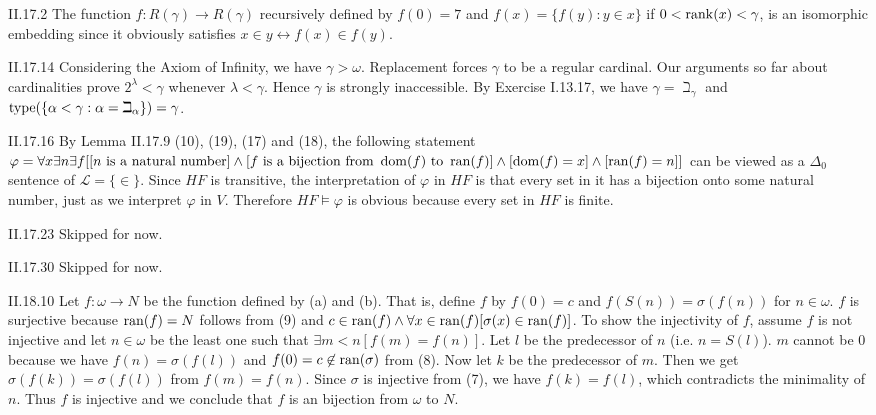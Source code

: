 \documentclass[12pt]{article}
\begin{document}
\begin{customthm}{II.17.2}
  The function $f:R(\gamma)\rightarrow R(\gamma)$ recursively defined by $f(0)=7$ and $f(x)=\{f(y):y\in x\}$ if $0<\mathop{\mathrm{rank}}(x)<\gamma$, is an isomorphic embedding since it obviously satisfies $x\in y\leftrightarrow f(x)\in f(y)$.
\end{customthm}

\begin{customthm}{II.17.14}
  Considering the Axiom of Infinity, we have $\gamma>\omega$. Replacement forces $\gamma$ to be a regular cardinal. Our arguments so far about cardinalities prove $2^\lambda<\gamma$ whenever $\lambda<\gamma$. Hence $\gamma$ is strongly inaccessible. By Exercise I.13.17, we have $\gamma=\beth_\gamma$ and $\mathop{\mathrm{type}}(\{\alpha<\gamma:\alpha=\beth_\alpha\})=\gamma$.
\end{customthm}

\begin{customthm}{II.17.16}
  By Lemma II.17.9 (10), (19), (17) and (18), the following statement $\varphi=\forall x\exists n\exists f[[n\textrm{ is a natural number}]\wedge[f\textrm{ is a bijection from }\mathop{\mathrm{dom}}(f)\textrm{ to }\mathop{\mathrm{ran}}(f)]\wedge[\mathop{\mathrm{dom}}(f)=x]\wedge[\mathop{\mathrm{ran}}(f)=n]]$ can be viewed as a $\Delta_0$ sentence of $\mathcal{L}=\{\in\}$. Since $HF$ is transitive, the interpretation of $\varphi$ in $HF$ is that every set in it has a bijection onto some natural number, just as we interpret $\varphi$ in $V$. Therefore $HF\models\varphi$ is obvious because every set in $HF$ is finite.
\end{customthm}

\begin{customthm}{II.17.23}
  Skipped for now.
\end{customthm}

\begin{customthm}{II.17.30}
  Skipped for now.
\end{customthm}

\begin{customthm}{II.18.10}
  Let $f:\omega\rightarrow N$ be the function defined by (a) and (b). That is, define $f$ by $f(0)=c$ and $f(S(n))=\sigma(f(n))$ for $n\in\omega$. $f$ is surjective because $\mathop{\mathrm{ran}}(f)=N$ follows from (9) and $c\in\mathop{\mathrm{ran}}(f)\wedge\forall x\in\mathop{\mathrm{ran}}(f)[\sigma(x)\in\mathop{\mathrm{ran}}(f)]$. To show the injectivity of $f$, assume $f$ is not injective and let $n\in\omega$ be the least one such that $\exists m<n[f(m)=f(n)]$. Let $l$ be the predecessor of $n$ (i.e. $n=S(l)$). $m$ cannot be $0$ because we have $f(n)=\sigma(f(l))$ and $f(0)=c\not\in\mathop{\mathrm{ran}}(\sigma)$ from (8). Now let $k$ be the predecessor of $m$. Then we get $\sigma(f(k))=\sigma(f(l))$ from $f(m)=f(n)$. Since $\sigma$ is injective from (7), we have $f(k)=f(l)$, which contradicts the minimality of $n$. Thus $f$ is injective and we conclude that $f$ is an bijection from $\omega$ to $N$.
\end{customthm}
\end{document}
